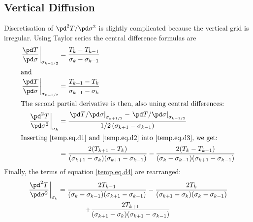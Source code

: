 \subsection{Vertical Diffusion}
Discretisation of $\pd^2T/\pd\sigma^2$ is slightly complicated because the vertical grid is irregular. Using Taylor series the central difference formulas are
\begin{subequations}
  \begin{align}
    \label{temp.eq.d1}
    \left.\frac{\pd T}{\pd\sigma}\right|_{\sigma_{k-1/2}}&=\frac{T_k-T_{k-1}}{\sigma_k-\sigma_{k-1}}\\
    \intertext{and}
    \label{temp.eq.d2}
    \left.\frac{\pd T}{\pd\sigma}\right|_{\sigma_{k+1/2}}&=\frac{T_{k+1}-T_k}{\sigma_{k+1}-\sigma_k}\\
    \intertext{The second partial derivative is then, also uning central differences:}
    \label{temp.eq.d3}
    \left.\frac{\pd^2 T}{\pd\sigma^2}\right|_{\sigma_k} &= \frac{\left.{\pd T}/{\pd\sigma}\right|_{\sigma_{k+1/2}} - \left.{\pd T}/{\pd\sigma}\right|_{\sigma_{k-1/2}}}{1/2\left(\sigma_{k+1}-\sigma_{k-1}\right)}\\
    \intertext{Inserting \eqref{temp.eq.d1} and \eqref{temp.eq.d2} into \eqref{temp.eq.d3}, we get:}
    \label{temp.eq.d4}
    &=\frac{2(T_{k+1}-T_k)}{(\sigma_{k+1}-\sigma_k)(\sigma_{k+1}-\sigma_{k-1})}-\frac{2(T_k-T_{k-1})}{(\sigma_k-\sigma_{k-1})(\sigma_{k+1}-\sigma_{k-1})}
  \end{align}
\end{subequations}
Finally, the terms of equation \eqref{temp.eq.d4} are rearranged:
\begin{multline}
  \left.\frac{\pd^2 T}{\pd\sigma^2}\right|_{\sigma_k} = \frac{2T_{k-1}}{(\sigma_k-\sigma_{k-1})(\sigma_{k+1}-\sigma_{k-1})} - \frac{2T_k}{(\sigma_{k+1}-\sigma_k)(\sigma_k-\sigma_{k-1})}\\
  + \frac{2T_{k+1}}{(\sigma_{k+1}-\sigma_k)(\sigma_{k+1}-\sigma_{k-1})}
\end{multline}

